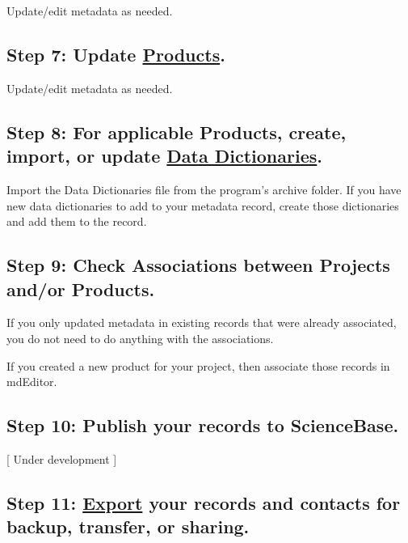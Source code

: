 \documentclass[
]{book}
\begin{document}
Update/edit metadata as needed.

\hypertarget{step-7-update-products.}{%
\subsection{\texorpdfstring{Step 7: Update \protect\hyperlink{product-entry-guidance}{Products}.}{Step 7: Update Products.}}\label{step-7-update-products.}}

Update/edit metadata as needed.

\hypertarget{step-8-for-applicable-products-create-import-or-update-data-dictionaries.}{%
\subsection{\texorpdfstring{Step 8: For applicable Products, create, import, or update \protect\hyperlink{dictionary-entry-guidance}{Data Dictionaries}.}{Step 8: For applicable Products, create, import, or update Data Dictionaries.}}\label{step-8-for-applicable-products-create-import-or-update-data-dictionaries.}}

Import the Data Dictionaries file from the program's archive folder. If you have new data dictionaries to add to your metadata record, create those dictionaries and add them to the record.

\hypertarget{step-9-check-associations-between-projects-andor-products.}{%
\subsection{Step 9: Check Associations between Projects and/or Products.}\label{step-9-check-associations-between-projects-andor-products.}}

If you only updated metadata in existing records that were already associated, you do not need to do anything with the associations.

If you created a new product for your project, then associate those records in mdEditor.

\hypertarget{step-10-publish-your-records-to-sciencebase.}{%
\subsection{Step 10: Publish your records to ScienceBase.}\label{step-10-publish-your-records-to-sciencebase.}}

{[} Under development {]}

\hypertarget{step-11-export-your-records-and-contacts-for-backup-transfer-or-sharing.}{%
\subsection{\texorpdfstring{Step 11: \protect\hyperlink{export}{Export} your records and contacts for backup, transfer, or sharing.}{Step 11: Export your records and contacts for backup, transfer, or sharing.}}\label{step-11-export-your-records-and-contacts-for-backup-transfer-or-sharing.}}
\end{document}
